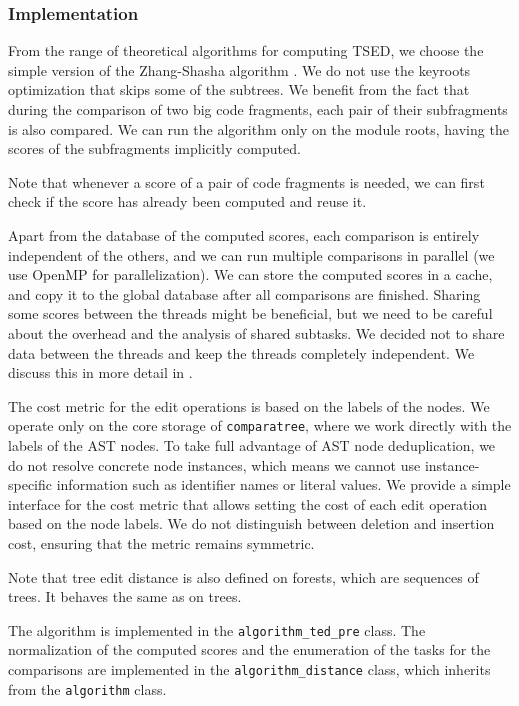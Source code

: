 \subsubsection{Implementation}

From the range of theoretical algorithms for computing TSED, we choose the simple version of the Zhang-Shasha algorithm \cite{zhang89}.
We do not use the keyroots optimization that skips some of the subtrees.
We benefit from the fact that during the comparison of two big code fragments, each pair of their subfragments is also compared.
We can run the algorithm only on the module roots, having the scores of the subfragments implicitly computed.

Note that whenever a score of a pair of code fragments is needed, we can first check if the score has already been computed and reuse it.

Apart from the database of the computed scores, each comparison is entirely independent of the others, and we can run multiple comparisons in parallel (we use OpenMP \cite{openmp} for parallelization).
We can store the computed scores in a cache, and copy it to the global database after all comparisons are finished.
Sharing some scores between the threads might be beneficial, but we need to be careful about the overhead and the analysis of shared subtasks.
We decided not to share data between the threads and keep the threads completely independent.
We discuss this in more detail in .

The cost metric for the edit operations is based on the labels of the nodes.
We operate only on the core storage of \texttt{comparatree}, where we work directly with the labels of the AST nodes.
To take full advantage of AST node deduplication, we do not resolve concrete node instances, which means we cannot use instance-specific information such as identifier names or literal values.
We provide a simple interface for the cost metric that allows setting the cost of each edit operation based on the node labels.
We do not distinguish between deletion and insertion cost, ensuring that the metric remains symmetric.

Note that tree edit distance is also defined on forests, which are sequences of trees.
It behaves the same as on trees.

The algorithm is implemented in the \texttt{algorithm\_ted\_pre} class.
The normalization of the computed scores and the enumeration of the tasks for the comparisons are implemented in the \texttt{algorithm\_distance} class, which inherits from the \texttt{algorithm} class.

